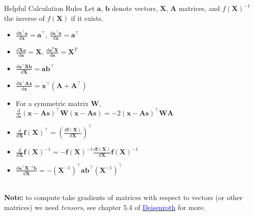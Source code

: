\documentclass[11pt,compress,t,notes=noshow, xcolor=table]{beamer}
\newcommand{\deriv}{d}
\begin{document}
\begin{vbframe}{Helpful Calculation Rules}
Let $\boldsymbol{a}$, $\boldsymbol{b}$ denote vectors, $\boldsymbol{X}$, $\boldsymbol{A}$ matrices, and $f(\boldsymbol{X})^{-1}$ the inverse of $f(\boldsymbol{X})$ if it exists. 
 \begin{itemize}
    \item $ \frac{\deriv \boldsymbol{x}^{\top} \boldsymbol{a}}{\deriv \boldsymbol{x}}=\boldsymbol{a}^{\top}$, $\frac{\deriv \boldsymbol{a}^{\top} \boldsymbol{x}}{\deriv \boldsymbol{x}}=\boldsymbol{a}^{\top}$
    \item $\frac{\deriv\boldsymbol{X}\boldsymbol{a}}{\deriv\boldsymbol{a}} = \boldsymbol{X}$, $\frac{\deriv\boldsymbol{a}^T\boldsymbol{X}}{\deriv\boldsymbol{a}} = \boldsymbol{X}^T$
    \item $\frac{\deriv \boldsymbol{a}^{\top} \boldsymbol{X} \boldsymbol{b}}{\deriv \boldsymbol{X}}=\boldsymbol{a} \boldsymbol{b}^{\top}$
    \item $\frac{\deriv \boldsymbol{x}^{\top} \boldsymbol{A} \boldsymbol{x}}{\deriv \boldsymbol{x}}=\boldsymbol{x}^{\top}\left(\boldsymbol{A}+\boldsymbol{A}^{\top}\right)$
    \item For a symmetric matrix $\boldsymbol{W}$, $\frac{\deriv}{\deriv \boldsymbol{s}}(\boldsymbol{x}-\boldsymbol{A} \boldsymbol{s})^{\top} \boldsymbol{W}(\boldsymbol{x}-\boldsymbol{A} \boldsymbol{s})=-2(\boldsymbol{x}-\boldsymbol{A} \boldsymbol{s})^{\top} \boldsymbol{W} \boldsymbol{A}$
    \item $\frac{\deriv}{\deriv \boldsymbol{X}} \boldsymbol{f}(\boldsymbol{X})^{\top}=\left(\frac{\deriv \boldsymbol{f}(\boldsymbol{X})}{\deriv \boldsymbol{X}}\right)^{\top}$
    \item $\frac{\deriv}{\deriv \boldsymbol{X}} \boldsymbol{f}(\boldsymbol{X})^{-1}=-\boldsymbol{f}(\boldsymbol{X})^{-1} \frac{\deriv \boldsymbol{f}(\boldsymbol{X})}{\deriv \boldsymbol{X}} \boldsymbol{f}(\boldsymbol{X})^{-1}$
    \item $\frac{\deriv \boldsymbol{a}^{\top} \boldsymbol{X}^{-1} \boldsymbol{b}}{\deriv \boldsymbol{X}}=-\left(\boldsymbol{X}^{-1}\right)^{\top} \boldsymbol{a} \boldsymbol{b}^{\top}\left(\boldsymbol{X}^{-1}\right)^{\top}$
    \end{itemize}  \,\\
    {\small\textbf{Note:} to compute take gradients of matrices
with respect to vectors (or other matrices) we need \emph{tensors}, see chapter 5.4 of \href{https://mml-book.github.io/book/mml-book.pdf}{\textcolor{blue}{Deisenroth}} for more.}
\end{vbframe}
\end{document}
